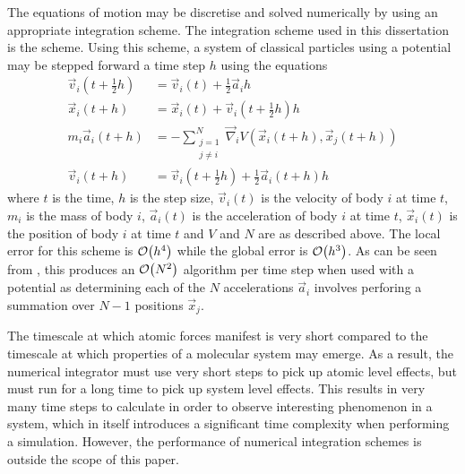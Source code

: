 %
The equations of motion may be discretise and solved numerically
by using an appropriate integration scheme.
%
The integration scheme used in this dissertation is
the \velocityverlet{} scheme.
%
Using this scheme, a system of classical particles using a \twobody{} potential
may be stepped forward a time step $h$ using the equations
%
\begin{subequations}
\label{eqn:velocity_verlet_scheme}
\begin{align}
    \vec{v}_i(t + \tfrac{1}{2} h) &=
        \vec{v}_i(t) + \tfrac{1}{2}\vec{a}_i h
    \label{eqn:velocity_verlet_v1_update}
    \\
    \vec{x}_i(t + h) &=
        \vec{x}_i(t) + \vec{v}_i(t + \tfrac{1}{2} h) h
    \label{eqn:velocity_verlet_position_update}
    \\
    m_i \vec{a}_i(t + h) &=
        - \sum_{\substack{j=1\\j\ne{}i}}^N
            \vec{\nabla}_i V(\vec{x}_i(t+h), \vec{x}_j(t+h))
    \label{eqn:velocity_verlet_force_eval}
    \\
    \vec{v}_i(t+h) &=
        \vec{v}_i(t + \tfrac{1}{2} h) + \tfrac{1}{2} \vec{a}_i(t + h) h
    \label{eqn:velocity_verlet_v2_update}
\end{align}
\end{subequations}
where $t$ is the time,
$h$ is the step size,
$\vec{v}_i(t)$ is the velocity of body $i$ at time $t$,
$m_i$ is the mass of body $i$,
$\vec{a}_i(t)$ is the acceleration of body $i$ at time $t$,
$\vec{x}_i(t)$ is the position of body $i$ at time $t$ and
$V$ and $N$ are as described above.
%
The local error for this scheme is $\mathcal{O}{\left({ h^4 }\right)}$ while the global error
is $\mathcal{O}{\left({ h^3 }\right)}$.
%
As can be seen from
,
this produces an $\mathcal{O}{\left({ N^2 }\right)}$ algorithm per time step
when used with a \twobody{} potential as
determining each of the $N$ accelerations $\vec{a}_i$ involves
perforing a summation over $N-1$ positions $\vec{x}_j$.

%
The timescale at which atomic forces manifest is very short compared to
the timescale at which properties of a molecular system may emerge.
%
As a result, the numerical integrator must use very short steps to
pick up atomic level effects, but must run for a long
time to pick up system level effects.
%
This results in very many time steps to calculate in order
to observe interesting phenomenon in a system, which
in itself introduces a significant time complexity
when performing a simulation.
%
However, the performance of numerical integration schemes is outside
the scope of this paper.



